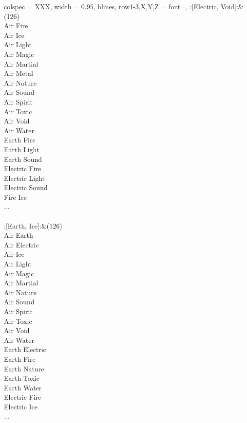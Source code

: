 \twocolumn
\begin{longtblr}[
	caption = {2v2 Attacking Effective},
	label = {2v2-Attacking-Effective},
]{
	colspec = {XXX}, width = 0.95\linewidth,
	hlines,
	row{1-3,X,Y,Z} = {font=\bfseries},
}
	:[Electric, Void]:&{(126)\\
	Air Fire \\
	Air Ice \\
	Air Light \\
	Air Magic \\
	Air Martial \\
	Air Metal \\
	Air Nature \\
	Air Sound \\
	Air Spirit \\
	Air Toxic \\
	Air Void \\
	Air Water \\
	Earth Fire \\
	Earth Light \\
	Earth Sound \\
	Electric Fire \\
	Electric Light \\
	Electric Sound \\
	Fire Ice \\
	...\\
	}\\

	:[Earth, Ice]:&{(126)\\
	Air Earth \\
	Air Electric \\
	Air Ice \\
	Air Light \\
	Air Magic \\
	Air Martial \\
	Air Nature \\
	Air Sound \\
	Air Spirit \\
	Air Toxic \\
	Air Void \\
	Air Water \\
	Earth Electric \\
	Earth Fire \\
	Earth Nature \\
	Earth Toxic \\
	Earth Water \\
	Electric Fire \\
	Electric Ice \\
	...\\
	}\\


\end{longtblr}
